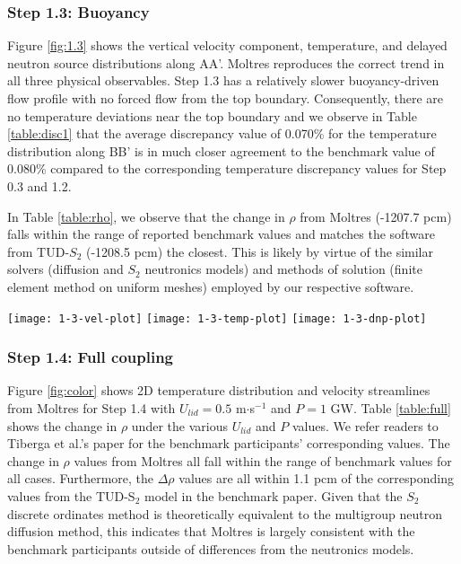 \subsubsection{Step 1.3: Buoyancy}

Figure \ref{fig:1.3} shows the vertical velocity component, temperature, and
delayed neutron source distributions along AA'.
Moltres reproduces the correct trend in all three physical
observables. Step 1.3 has a relatively slower buoyancy-driven flow profile with
no forced flow from the top boundary. Consequently, there are no temperature
deviations near the top boundary and we observe in Table \ref{table:disc1} that
the average discrepancy value of 0.070\% for the temperature distribution along
BB' is in much closer agreement to the benchmark value of 0.080\% compared to
the corresponding temperature discrepancy values for Step 0.3 and 1.2.

In Table \ref{table:rho}, we observe that the change in $\rho$ from
Moltres (-1207.7 pcm) falls within the range of reported benchmark values and
matches the software from TUD-$S_2$ (-1208.5 pcm) the closest. This is likely
by virtue of the similar solvers (diffusion and $S_2$ neutronics models) and
methods of solution (finite element method on uniform meshes) employed by our
respective software.
%
\begin{figure*}[htb]
	\centering
	\texttt{[image: 1-3-vel-plot]}
	\texttt{[image: 1-3-temp-plot]}
	\texttt{[image: 1-3-dnp-plot]}
	\caption{Step 1.3 \textemdash\ Vertical velocity component, temperature distribution,
	and delayed neutron source along AA'.}
	\label{fig:1.3}
\end{figure*}

\FloatBarrier

\subsubsection{Step 1.4: Full coupling}

Figure \ref{fig:color} shows 2D temperature distribution and velocity
streamlines from Moltres for Step 1.4 with $U_{lid} = 0.5$ m$\cdot$s$^{-1}$ and
$P = 1$ GW. Table \ref{table:full} shows the change in $\rho$ under the various
$U_{lid}$ and $P$ values. We refer readers to Tiberga et al.'s paper
\cite{tiberga_results_2020} for the benchmark participants' corresponding
values. The change in $\rho$ values from Moltres all fall within the range of
benchmark values
for all cases. Furthermore, the $\Delta\rho$ values are all within 1.1 pcm of
the corresponding values from the TUD-S$_2$ model in the benchmark paper. Given
that the $S_2$ discrete ordinates method is theoretically equivalent to the
multigroup neutron diffusion method, this indicates that Moltres is largely
consistent with the benchmark participants outside of differences from the
neutronics models.

